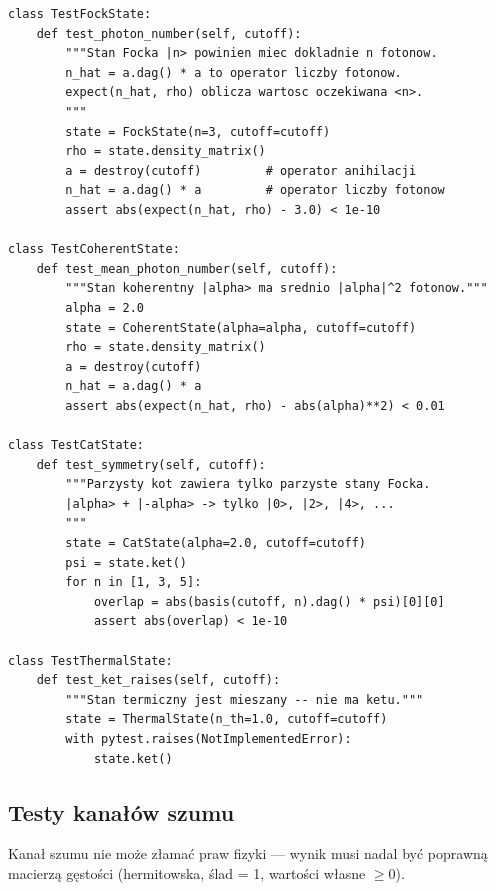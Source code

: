 \documentclass[12pt,a4paper]{article}
\begin{document}
\begin{lstlisting}[caption={Testy stanów kwantowych --- przykłady.}, label={lst:test-states}]
class TestFockState:
    def test_photon_number(self, cutoff):
        """Stan Focka |n> powinien miec dokladnie n fotonow.
        n_hat = a.dag() * a to operator liczby fotonow.
        expect(n_hat, rho) oblicza wartosc oczekiwana <n>.
        """
        state = FockState(n=3, cutoff=cutoff)
        rho = state.density_matrix()
        a = destroy(cutoff)         # operator anihilacji
        n_hat = a.dag() * a         # operator liczby fotonow
        assert abs(expect(n_hat, rho) - 3.0) < 1e-10

class TestCoherentState:
    def test_mean_photon_number(self, cutoff):
        """Stan koherentny |alpha> ma srednio |alpha|^2 fotonow."""
        alpha = 2.0
        state = CoherentState(alpha=alpha, cutoff=cutoff)
        rho = state.density_matrix()
        a = destroy(cutoff)
        n_hat = a.dag() * a
        assert abs(expect(n_hat, rho) - abs(alpha)**2) < 0.01

class TestCatState:
    def test_symmetry(self, cutoff):
        """Parzysty kot zawiera tylko parzyste stany Focka.
        |alpha> + |-alpha> -> tylko |0>, |2>, |4>, ...
        """
        state = CatState(alpha=2.0, cutoff=cutoff)
        psi = state.ket()
        for n in [1, 3, 5]:
            overlap = abs(basis(cutoff, n).dag() * psi)[0][0]
            assert abs(overlap) < 1e-10

class TestThermalState:
    def test_ket_raises(self, cutoff):
        """Stan termiczny jest mieszany -- nie ma ketu."""
        state = ThermalState(n_th=1.0, cutoff=cutoff)
        with pytest.raises(NotImplementedError):
            state.ket()
\end{lstlisting}

\subsection{Testy kanałów szumu}

\begin{infobox}
Kanał szumu nie może złamać praw fizyki --- wynik musi nadal być poprawną macierzą gęstości (hermitowska, ślad = 1, wartości własne $\geq 0$).
\end{infobox}
\end{document}
